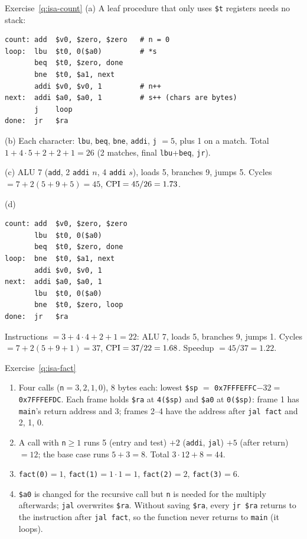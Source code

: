 \begin{noot}{Exercise~\ref{q:isa-count}}
(a) A leaf procedure that only uses \texttt{\$t} registers needs no stack:
\begin{lstlisting}
count: add  $v0, $zero, $zero   # n = 0
loop:  lbu  $t0, 0($a0)         # *s
       beq  $t0, $zero, done
       bne  $t0, $a1, next
       addi $v0, $v0, 1         # n++
next:  addi $a0, $a0, 1         # s++ (chars are bytes)
       j    loop
done:  jr   $ra
\end{lstlisting}
(b) Each character: \texttt{lbu}, \texttt{beq}, \texttt{bne}, \texttt{addi},
\texttt{j} $=5$, plus 1 on a match. Total $1+4\cdot5+2+2+1=26$ (2 matches,
final \texttt{lbu}+\texttt{beq}, \texttt{jr}).

(c) ALU 7 (\texttt{add}, 2 \texttt{addi} $n$, 4 \texttt{addi} $s$), loads 5,
branches 9, jumps 5. Cycles $=7+2(5+9+5)=45$, $\mathrm{CPI}=45/26=1.73$.

(d)
\begin{lstlisting}
count: add  $v0, $zero, $zero
       lbu  $t0, 0($a0)
       beq  $t0, $zero, done
loop:  bne  $t0, $a1, next
       addi $v0, $v0, 1
next:  addi $a0, $a0, 1
       lbu  $t0, 0($a0)
       bne  $t0, $zero, loop
done:  jr   $ra
\end{lstlisting}
Instructions $=3+4\cdot4+2+1=22$: ALU 7, loads 5, branches 9, jumps 1.
Cycles $=7+2(5+9+1)=37$, $\mathrm{CPI}=37/22=1.68$. Speedup $=45/37=1.22$.
\end{noot}

\begin{noot}{Exercise~\ref{q:isa-fact}}
\begin{enumerate}[label=(\alph*),leftmargin=*]
  \item Four calls (\texttt{n}$=3,2,1,0$), 8 bytes each: lowest
  \texttt{\$sp} $=$ \texttt{0x7FFFEFFC}$-32=$ \texttt{0x7FFFEFDC}. Each frame
  holds \texttt{\$ra} at \texttt{4(\$sp)} and \texttt{\$a0} at
  \texttt{0(\$sp)}: frame 1 has \texttt{main}'s return address and 3; frames
  2--4 have the address after \texttt{jal fact} and 2, 1, 0.
  \item A call with \texttt{n}$\ge1$ runs 5 (entry and test) $+2$
  (\texttt{addi}, \texttt{jal}) $+5$ (after return) $=12$; the base case runs
  $5+3=8$. Total $3\cdot12+8=44$.
  \item \texttt{fact(0)}$=1$, \texttt{fact(1)}$=1\cdot1=1$,
  \texttt{fact(2)}$=2$, \texttt{fact(3)}$=6$.
  \item \texttt{\$a0} is changed for the recursive call but \texttt{n} is
  needed for the multiply afterwards; \texttt{jal} overwrites \texttt{\$ra}.
  Without saving \texttt{\$ra}, every \texttt{jr \$ra} returns to the
  instruction after \texttt{jal fact}, so the function never returns to
  \texttt{main} (it loops).
\end{enumerate}
\end{noot}

